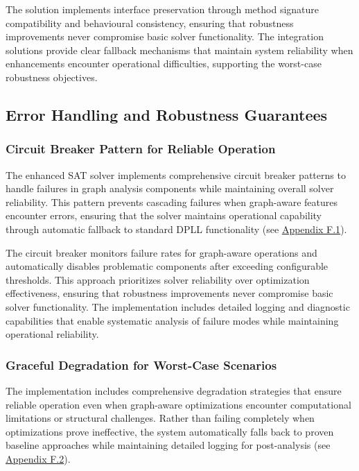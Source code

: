 The solution implements interface preservation through method signature compatibility and behavioural consistency, ensuring that robustness improvements never compromise basic solver functionality. The integration solutions provide clear fallback mechanisms that maintain system reliability when enhancements encounter operational difficulties, supporting the worst-case robustness objectives.

\subsection{Error Handling and Robustness Guarantees}

\subsubsection{Circuit Breaker Pattern for Reliable Operation}

The enhanced SAT solver implements comprehensive circuit breaker patterns to handle failures in graph analysis components while maintaining overall solver reliability. This pattern prevents cascading failures when graph-aware features encounter errors, ensuring that the solver maintains operational capability through automatic fallback to standard DPLL functionality (see \hyperref[appendix:circuit-breaker]{Appendix F.1}).

The circuit breaker monitors failure rates for graph-aware operations and automatically disables problematic components after exceeding configurable thresholds. This approach prioritizes solver reliability over optimization effectiveness, ensuring that robustness improvements never compromise basic solver functionality. The implementation includes detailed logging and diagnostic capabilities that enable systematic analysis of failure modes while maintaining operational reliability.

\subsubsection{Graceful Degradation for Worst-Case Scenarios}

The implementation includes comprehensive degradation strategies that ensure reliable operation even when graph-aware optimizations encounter computational limitations or structural challenges. Rather than failing completely when optimizations prove ineffective, the system automatically falls back to proven baseline approaches while maintaining detailed logging for post-analysis (see \hyperref[appendix:graceful-degradation]{Appendix F.2}).

